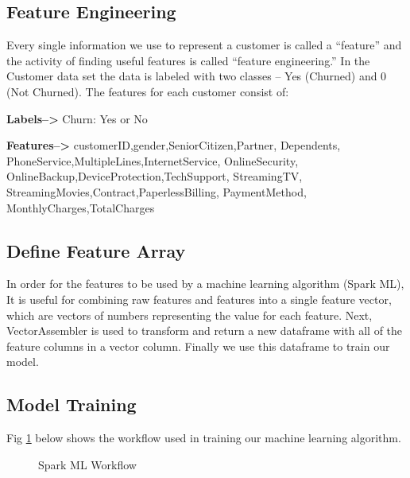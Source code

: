 \documentclass[9pt,twocolumn,twoside]{../../styles/osajnl}
\begin{document}
	\subsection{Feature Engineering}
		Every single information we use to represent a customer is called a “feature” and the activity of finding useful features is called “feature engineering.” In the Customer data set the data is labeled with two classes – Yes (Churned) and 0
		(Not Churned). The features for each customer consist of:
		\begin{description}
			\item \textbf{Labels-->} Churn: Yes or No
			\item \textbf{Features-->} customerID,gender,SeniorCitizen,Partner,
			Dependents, PhoneService,MultipleLines,InternetService,
			OnlineSecurity,
			OnlineBackup,DeviceProtection,TechSupport,
			StreamingTV,
			StreamingMovies,Contract,PaperlessBilling,
			PaymentMethod,
			MonthlyCharges,TotalCharges		
		\end{description}

	\subsection{Define Feature Array}
		In order for the features to be used by a machine learning algorithm (Spark ML), It is useful for combining raw features and features into a single feature vector, which are vectors of numbers representing the value for each feature. Next, VectorAssembler\cite{VectorAssembler} is used to transform and return a new dataframe with all of the feature columns in a vector column. Finally we use this dataframe to train our model.

	\subsection{Model Training}

	Fig \ref{Workflow} below shows the workflow used in training our machine learning algorithm.

		\begin{figure}[htbp]
		\centering
		\caption{Spark ML Workflow \cite{ML-Workflow}}
		\label{Workflow}
		\end{figure}
\end{document}
